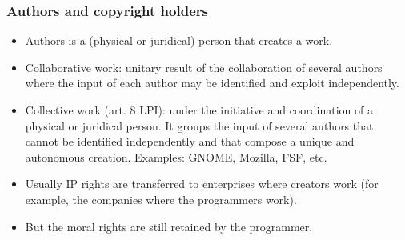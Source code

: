 \begin{frame}
\frametitle{Authors and copyright holders}

\begin{itemize}

\item Authors is a (physical or juridical) person that creates
a work. 

\item \alert{Collaborative work}: unitary result of the collaboration
of several authors where the input of each author may be
identified and exploit independently.
\item \alert{Collective work} (art. 8 LPI): under the initiative and coordination of
a physical or juridical person. It groups the input
of several authors that cannot be identified independently
and that compose a unique and autonomous creation. {\footnotesize Examples: GNOME,
Mozilla, FSF, etc.}
\item Usually IP rights are transferred to enterprises where creators
work (for example, the companies where the programmers work). 
\item But the moral rights are still retained by the programmer.


\end{itemize}

\end{frame}



%
%
%


